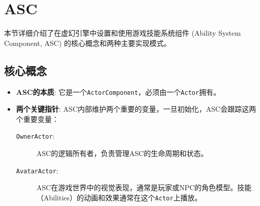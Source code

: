 \documentclass[math,code,10pt,CJKmath]{amznotes}
\begin{document}
\section{ASC}
本节详细介绍了在虚幻引擎中设置和使用游戏技能系统组件 (Ability System Component, ASC) 的核心概念和两种主要实现模式。

\subsection{核心概念}
\begin{itemize}
    \item \textbf{ASC的本质}: 它是一个\texttt{ActorComponent}，必须由一个\texttt{Actor}拥有。
    \item \textbf{两个关键指针}: ASC内部维护两个重要的变量，一旦初始化，ASC会跟踪这两个重要变量：
    \begin{description}
        \item[\texttt{OwnerActor}:] ASC的逻辑所有者，负责管理ASC的生命周期和状态。
        \item[\texttt{AvatarActor}:] ASC在游戏世界中的视觉表现，通常是玩家或NPC的角色模型。技能（Abilities）的动画和效果通常在这个\texttt{Actor}上播放。
    \end{description}
\end{itemize}
\end{document}
